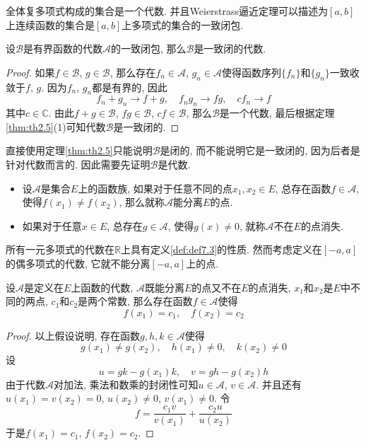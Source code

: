 \documentclass[cn,12pt,math=mtpro2,citestyle=gb7714-2015,bibstyle=gb7714-2015,twocol]{elegantbook}
\newcommand{\R}{\mathbb{R}}
\begin{document}
\begin{example}
全体复多项式构成的集合是一个代数. 并且Weierstrass逼近定理可以描述为$[a,b]$上连续函数的集合是$[a,b]$上多项式的集合的一致闭包.
\end{example}
\begin{theorem}\label{thm:th7.7}
  设$\mathscr{B}$是有界函数的代数$\mathscr{A}$的一致闭包, 那么$\mathscr{B}$是一致闭的代数.
\end{theorem}
\begin{proof}
  如果$f\in\mathscr{B}$, $g\in\mathscr{B}$, 那么存在$f_n\in\mathscr{A}$, $g_n\in\mathscr{A}$使得函数序列$\{f_n\}$和$\{g_n\}$一致收敛于$f$, $g$. 因为$f_n$, $g_n$都是有界的, 因此
  $$f_n+g_n\to f+g,\quad f_ng_n\to fg,\quad cf_n\to f$$
  其中$c\in\mathbb{C}$. 由此$f+g\in\mathscr{B}$, $fg\in\mathscr{B}$, $cf\in\mathscr{B}$, 那么$\mathscr{B}$是一个代数, 最后根据定理\ref{thm:th2.5}(1)可知代数$\mathscr{B}$是一致闭的.
\end{proof}
\begin{remark}
直接使用定理\ref{thm:th2.5}只能说明$\mathscr{B}$是闭的, 而不能说明它是一致闭的, 因为后者是针对代数而言的. 因此需要先证明$\mathscr{B}$是代数.
\end{remark}
\begin{definition}\label{def:def7.3}
\begin{itemize}
\item 设$\mathscr{A}$是集合$E$上的函数族, 如果对于任意不同的点$x_1,x_2\in E$, 总存在函数$f\in\mathscr{A}$, 使得$f(x_1)\neq f(x_2)$, 那么就称$\mathscr{A}$能分离$E$的点.

\item 如果对于任意$x\in E$, 总存在$g\in\mathscr{A}$, 使得$g(x)\neq 0$, 就称$\mathscr{A}$不在$E$的点消失.
\end{itemize}
\end{definition}
\begin{example}
所有一元多项式的代数在$\R$上具有定义\ref{def:def7.3}的性质. 然而考虑定义在$[-a,a]$的偶多项式的代数, 它就不能分离$[-a,a]$上的点.
\end{example}
\begin{theorem}\label{thm:th7.8}
  设$\mathscr{A}$是定义在$E$上函数的代数, $\mathscr{A}$既能分离$E$的点又不在$E$的点消失, $x_1$和$x_2$是$E$中不同的两点, $c_1$和$c_2$是两个常数, 那么存在函数$f\in\mathscr{A}$使得
  $$f(x_1)=c_1,\quad f(x_2)=c_2$$
\end{theorem}
\begin{proof}
  以上假设说明, 存在函数$g, h, k \in\mathscr{A}$使得
  $$g(x_1)\neq g(x_2),\quad h(x_1)\neq0, \quad k(x_2)\neq 0$$
  设
  $$u=gk-g(x_1)k,\quad v=gh-g(x_2)h$$
  由于代数$\mathscr{A}$对加法, 乘法和数乘的封闭性可知$u\in\mathscr{A}$, $v\in\mathscr{A}$. 并且还有$u(x_1)=v(x_2)=0$, $u(x_2)\neq 0$, $v(x_1)\neq 0$. 令
  $$f=\frac{c_1v}{v(x_1)}+\frac{c_2u}{u(x_2)}$$
  于是$f(x_1)=c_1$, $f(x_2)=c_2$.


\end{proof}
\end{document}
